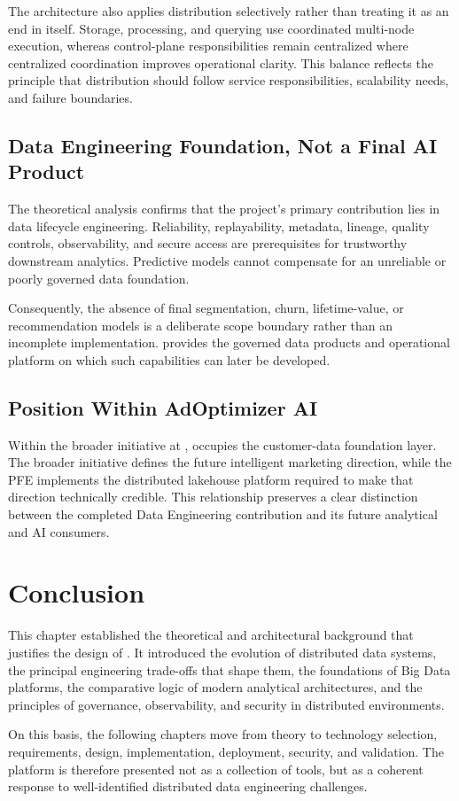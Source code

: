 The architecture also applies distribution selectively rather than treating it as an end in itself. Storage, processing, and querying use coordinated multi-node execution, whereas control-plane responsibilities remain centralized where centralized coordination improves operational clarity. This balance reflects the principle that distribution should follow service responsibilities, scalability needs, and failure boundaries.

\subsection{Data Engineering Foundation, Not a Final AI Product}
The theoretical analysis confirms that the project's primary contribution lies in data lifecycle engineering. Reliability, replayability, metadata, lineage, quality controls, observability, and secure access are prerequisites for trustworthy downstream analytics. Predictive models cannot compensate for an unreliable or poorly governed data foundation.

Consequently, the absence of final segmentation, churn, lifetime-value, or recommendation models is a deliberate scope boundary rather than an incomplete implementation. \projectname{} provides the governed data products and operational platform on which such capabilities can later be developed.

\subsection{Position Within AdOptimizer AI}
Within the broader \initiative{} initiative at \companyname{}, \projectname{} occupies the customer-data foundation layer. The broader initiative defines the future intelligent marketing direction, while the PFE implements the distributed lakehouse platform required to make that direction technically credible. This relationship preserves a clear distinction between the completed Data Engineering contribution and its future analytical and AI consumers.

\section{Conclusion}
This chapter established the theoretical and architectural background that justifies the design of \projectname. It introduced the evolution of distributed data systems, the principal engineering trade-offs that shape them, the foundations of Big Data platforms, the comparative logic of modern analytical architectures, and the principles of governance, observability, and security in distributed environments.

On this basis, the following chapters move from theory to technology selection, requirements, design, implementation, deployment, security, and validation. The platform is therefore presented not as a collection of tools, but as a coherent response to well-identified distributed data engineering challenges.
